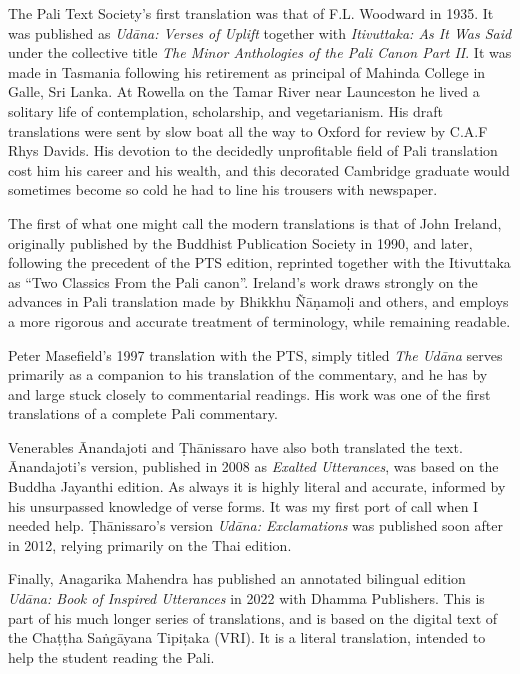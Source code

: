 \documentclass[12pt,openany]{book}%
\begin{document}
The Pali Text Society’s first translation was that of F.L. Woodward in 1935. It was published as \textit{\textsanskrit{Udāna}: Verses of Uplift} together with \textit{Itivuttaka: As It Was Said} under the collective title \textit{The Minor Anthologies of the Pali Canon Part II}. It was made in Tasmania following his retirement as principal of Mahinda College in Galle, Sri Lanka. At Rowella on the Tamar River near Launceston he lived a solitary life of contemplation, scholarship, and vegetarianism. His draft translations were sent by slow boat all the way to Oxford for review by C.A.F Rhys Davids. His devotion to the decidedly unprofitable field of Pali translation cost him his career and his wealth, and this decorated Cambridge graduate would sometimes become so cold he had to line his trousers with newspaper. 

The first of what one might call the modern translations is that of John Ireland, originally published by the Buddhist Publication Society in 1990, and later, following the precedent of the PTS edition, reprinted together with the Itivuttaka as “Two Classics From the Pali canon”. Ireland’s work draws strongly on the advances in Pali translation made by Bhikkhu \textsanskrit{Ñāṇamoḷi} and others, and employs a more rigorous and accurate treatment of terminology, while remaining readable. 

Peter Masefield’s 1997 translation with the PTS, simply titled \textit{The \textsanskrit{Udāna}} serves primarily as a companion to his translation of the commentary, and he has by and large stuck closely to commentarial readings. His work was one of the first translations of a complete Pali commentary.

Venerables Ānandajoti and \textsanskrit{Ṭhānissaro} have also both translated the text. Ānandajoti’s version, published in 2008 as \textit{Exalted Utterances}, was based on the Buddha Jayanthi edition. As always it is highly literal and accurate, informed by his unsurpassed knowledge of verse forms. It was my first port of call when I needed help. \textsanskrit{Ṭhānissaro}’s version \textit{\textsanskrit{Udāna}: Exclamations} was published soon after in 2012, relying primarily on the Thai edition.

Finally, Anagarika Mahendra has published an annotated bilingual edition \textit{\textsanskrit{Udāna}: Book of Inspired Utterances} in 2022 with Dhamma Publishers. This is part of his much longer series of translations, and is based on the digital text of the \textsanskrit{Chaṭṭha} \textsanskrit{Saṅgāyana} \textsanskrit{Tipiṭaka} (VRI). It is a literal translation, intended to help the student reading the Pali.
\end{document}
